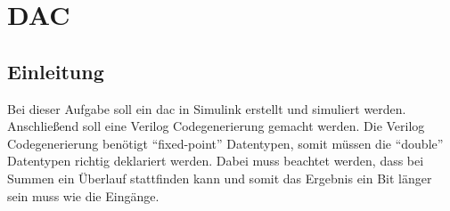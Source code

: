 \documentclass[./\jobname.tex]{subfiles}
\begin{document}
%
\def\codeFolderName{deltasigma}
\def\codeFileName{ds_dac_sl}
\def\codeFolderNameB{}
%
\chapter{DAC}
%
\section{Einleitung}
%
Bei dieser Aufgabe soll ein \gls{dac} in Simulink erstellt und simuliert werden. Anschließend soll eine Verilog Codegenerierung gemacht werden. Die Verilog Codegenerierung benötigt \enquote{fixed-point} Datentypen, somit müssen die \enquote{double} Datentypen richtig deklariert werden. Dabei muss beachtet werden, dass bei Summen ein Überlauf stattfinden kann und somit das Ergebnis ein Bit länger sein muss wie die Eingänge.
%
\end{document}

